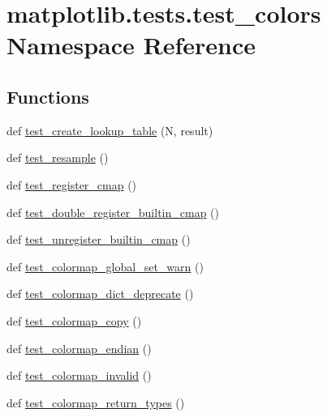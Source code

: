\hypertarget{namespacematplotlib_1_1tests_1_1test__colors}{}\section{matplotlib.\+tests.\+test\+\_\+colors Namespace Reference}
\label{namespacematplotlib_1_1tests_1_1test__colors}
\subsection*{Functions}
\begin{DoxyCompactItemize}
\item 
def \hyperlink{namespacematplotlib_1_1tests_1_1test__colors_aa7fe22a7fff5fc0b0d1461bcd6a7a2a4}{test\+\_\+create\+\_\+lookup\+\_\+table} (N, result)
\item 
def \hyperlink{namespacematplotlib_1_1tests_1_1test__colors_a7967072007a8180959d577dda9ecb1f4}{test\+\_\+resample} ()
\item 
def \hyperlink{namespacematplotlib_1_1tests_1_1test__colors_ad78dfa1e20684ca64302961033a0d5e9}{test\+\_\+register\+\_\+cmap} ()
\item 
def \hyperlink{namespacematplotlib_1_1tests_1_1test__colors_a74b87ae95cee1f603454c163f50c0ca7}{test\+\_\+double\+\_\+register\+\_\+builtin\+\_\+cmap} ()
\item 
def \hyperlink{namespacematplotlib_1_1tests_1_1test__colors_acaa5d184587c3f6670637b188a22367b}{test\+\_\+unregister\+\_\+builtin\+\_\+cmap} ()
\item 
def \hyperlink{namespacematplotlib_1_1tests_1_1test__colors_a8ee9e9ab092a0b7e09c109d69c6d8997}{test\+\_\+colormap\+\_\+global\+\_\+set\+\_\+warn} ()
\item 
def \hyperlink{namespacematplotlib_1_1tests_1_1test__colors_ab7f9941e7bf2d5edbf64416331442889}{test\+\_\+colormap\+\_\+dict\+\_\+deprecate} ()
\item 
def \hyperlink{namespacematplotlib_1_1tests_1_1test__colors_a559d0e84affc59881833fa69b43f118b}{test\+\_\+colormap\+\_\+copy} ()
\item 
def \hyperlink{namespacematplotlib_1_1tests_1_1test__colors_a45fedcf4d99ac43c7ab311a25db7533d}{test\+\_\+colormap\+\_\+endian} ()
\item 
def \hyperlink{namespacematplotlib_1_1tests_1_1test__colors_ade0b2f428d3bfa5a4ab4e3b0d511b9ef}{test\+\_\+colormap\+\_\+invalid} ()
\item 
def \hyperlink{namespacematplotlib_1_1tests_1_1test__colors_aa1fef2c339060e4ca8fb8ffc939e0c24}{test\+\_\+colormap\+\_\+return\+\_\+types} ()

\end{DoxyCompactItemize}

